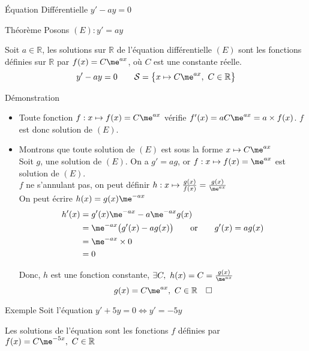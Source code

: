\documentclass{cours}
\begin{document}
    \begin{Gpartie}{Équation Différentielle $y'-ay=0$} 
        \begin{Spartie}{Théorème} 
            Posons $(E) : y'=ay$

            Soit $a\in\mathbb{R}$, les solutions sur $\mathbb{R}$ de l'équation différentielle $(E)$ sont les fonctions définies sur $\mathbb{R}$ par $f(x)=C\me^{ax}$, où $C$ est une constante réelle.
            \[y'-ay=0\qquad \mathcal{S}=\big\{x\mapsto C\me^{ax},\ C\in\mathbb{R}\big\}\]

            \begin{SSpartie}{Démonstration} 
                \begin{itemize}
                    \item Toute fonction $f:x\mapsto f(x)=C\me^{ax}$ vérifie $f'(x)=aC\me^{ax}=a\times f(x)$. $f$ est donc solution de $(E)$.
                    \item Montrons que toute solution de $(E)$ est sous la forme $x\mapsto C\me^{ax}$ \\
                    Soit $g$, une solution de $(E)$. On a $g'=ag$, or $f:x\mapsto f(x)=\me^{ax}$ est solution de $(E)$. \\
                    $f$ ne s'annulant pas, on peut définir $h:x\mapsto \frac{g(x)}{f(x)}=\frac{g(x)}{\me^{ax}}$ \\
                    On peut écrire $h(x)=g(x)\me^{-ax}$
                    \[\begin{aligned}[t]
                        h'(x)&=g'(x)\me^{-ax}-a\me^{-ax}g(x) \\
                        &=\me^{-ax}\big(g'(x)-ag(x)\big)\qquad\text{or}\qquad g'(x)=ag(x) \\
                        &=\me^{-ax}\times 0 \\
                        &=0
                    \end{aligned}\]

                    Donc, $h$ est une fonction constante, $\exists C,\ h(x)=C=\frac{g(x)}{\me^{ax}}$
                    \[g(x)=C\me^{ax},\ C\in\mathbb{R}\quad\square\]
                \end{itemize}
            \end{SSpartie}
            \begin{Spartie}{Exemple} 
                Soit l'équation $y'+5y=0\iff y'=-5y$

                Les solutions de l'équation sont les fonctions $f$ définies par $f(x)=C\me^{-5x},\ C\in\mathbb{R}$
            \end{Spartie}
        \end{Spartie}
    \end{Gpartie}
\end{document}
